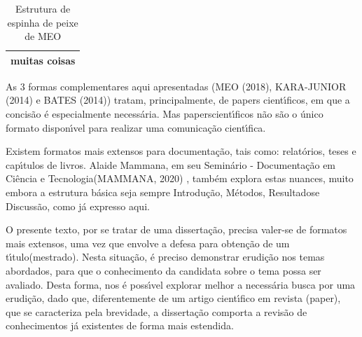\documentclass[
12pt,		%
openright,	%
twoside,  %
a4paper,			%
chapter=TITLE,		%
english,			%
french,				%
spanish,			%
brazil				%
]{USPSC-classe/USPSC}
\begin{document}
\begin{table}[htb]
\tiny
\caption{\label{404d3407ceff6ff9d0cc5a71368147d571c7f79a}Estrutura de espinha de peixe de MEO}

\centering
\begin{tabular}{|c|}
\hline
muitas coisas \\\hline

\end{tabular}
\end{table}


As 3 formas complementares aqui apresentadas (MEO (2018),  KARA-JUNIOR (2014) e BATES (2014)) tratam, principalmente, de papers cient\'{\i}ficos, em que a concis\~ao \'e especialmente necess\'aria. Mas \textquotedbl papers\textquotedbl  cient\'{\i}ficos n\~ao s\~ao o \'unico formato dispon\'{\i}vel para realizar uma comunica\c{c}\~ao cient\'{\i}fica.














Existem formatos mais extensos para documenta\c{c}\~ao, tais como: relat\'orios, teses e cap\'{\i}tulos de livros. Alaide Mammana, em seu \textquotedbl Semin\'ario - Documenta\c{c}\~ao em Ci\^encia e Tecnologia\textquotedbl   (MAMMANA, 2020) , tamb\'em explora estas nuances, muito embora a estrutura b\'asica seja sempre \textquotedbl Introdu\c{c}\~ao\textquotedbl , \textquotedbl M\'etodos\textquotedbl , \textquotedbl Resultados\textquotedbl  e \textquotedbl Discuss\~ao\textquotedbl , como j\'a expresso aqui.














O presente texto, por se tratar de uma disserta\c{c}\~ao, precisa valer-se de formatos mais extensos, uma vez que envolve a \textquotedbl defesa para obten\c{c}\~ao de um t\'{\i}tulo\textquotedbl  (mestrado). Nesta situa\c{c}\~ao, \'e preciso demonstrar erudi\c{c}\~ao nos temas abordados, para que o conhecimento da candidata sobre o tema possa ser avaliado. Desta forma, nos \'e poss\'{\i}vel explorar melhor a necess\'aria busca por uma erudi\c{c}\~ao, dado que, diferentemente de um artigo cient\'{\i}fico em revista (\textquotedbl paper\textquotedbl ), que se caracteriza pela brevidade, a disserta\c{c}\~ao  comporta a revis\~ao de conhecimentos j\'a existentes de forma mais estendida.
\end{document}
